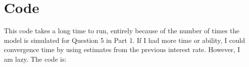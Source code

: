 \documentclass[10pt]{article}
\begin{document}
\newpage
\section*{Code}\label{sec:code}

This code takes a long time to run, entirely because of the number of times the model is simulated for Question 5 in Part 1. If I had more time or ability, I could convergence time by using estimates from the previous interest rate. However, I am lazy. The code is:


\end{document}
